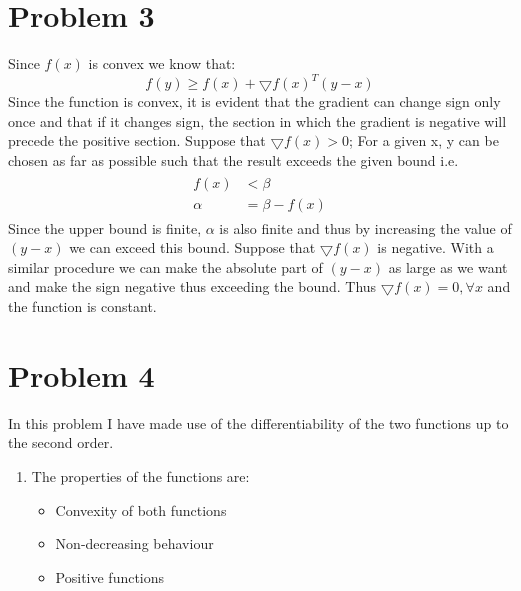 \documentclass[a4paper]{article}
\begin{document}
\begin{Large}
	\section*{Problem 3}
	Since $ f(x) $ is convex we know that:
	\begin{equation}\label{key}
	f(y) \geq f(x) + \bigtriangledown f(x)^T(y-x)
	\end{equation}
	Since the function is convex, it is evident that the gradient can change sign only once and that if it changes sign, the section in which the gradient is negative will precede the positive section. Suppose that $ \bigtriangledown f(x) >0 $; For a given x, y can be chosen as far as possible such that the result exceeds the given bound i.e.
	\begin{align}
	\begin{split}
	f(x)&<\beta\\
	\alpha&=\beta-f(x)
	\end{split}
	\end{align}
	Since the upper bound is finite, $ \alpha $ is also finite and thus by increasing the value of $ (y-x) $ we can exceed this bound. Suppose that $ \bigtriangledown f(x) $ is negative. With a similar procedure we can make the absolute part of	$ (y-x) $ as large as we want and make the sign negative thus exceeding the bound. Thus $ \bigtriangledown f(x) = 0, \forall x $ and the function is constant.
	\newpage
	\section*{Problem 4}
	In this problem I have made use of the differentiability of the two functions up to the second order.
	\begin{enumerate}[label=\alph*)]
		\item The properties of the functions are:\\
	\begin{itemize}
		\item 		Convexity of both functions
		\item 	Non-decreasing behaviour
		\item  Positive functions
	\end{itemize}


\end{enumerate}
\end{Large}
\end{document}
